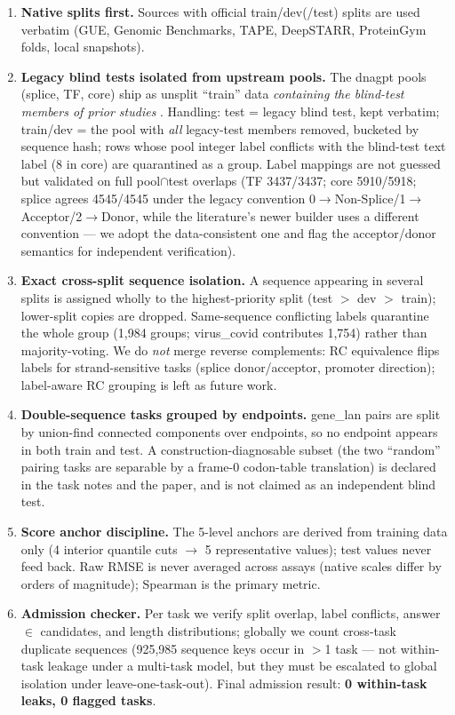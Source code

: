 \begin{enumerate}
\item \textbf{Native splits first.} Sources with official train/dev(/test) splits are used
verbatim (GUE, Genomic Benchmarks, TAPE, DeepSTARR, ProteinGym folds, local snapshots).
\item \textbf{Legacy blind tests isolated from upstream pools.} The dnagpt pools (splice,
TF, core) ship as unsplit ``train'' data \emph{containing the blind-test members of prior
studies} \citep{wang2026biopaws}. Handling: test = legacy blind test, kept verbatim;
train/dev = the pool with \emph{all} legacy-test members removed, bucketed by sequence
hash; rows whose pool integer label conflicts with the blind-test text label (8 in core)
are quarantined as a group. Label mappings are not guessed but validated on full
pool$\cap$test overlaps (TF 3437/3437; core 5910/5918; splice agrees 4545/4545 under the
legacy convention 0$\to$Non-Splice/1$\to$Acceptor/2$\to$Donor, while the literature's newer
builder uses a different convention --- we adopt the data-consistent one and flag the
acceptor/donor semantics for independent verification).
\item \textbf{Exact cross-split sequence isolation.} A sequence appearing in several splits
is assigned wholly to the highest-priority split (test $>$ dev $>$ train); lower-split
copies are dropped. Same-sequence conflicting labels quarantine the whole group (1{,}984
groups; virus\_covid contributes 1{,}754) rather than majority-voting. We do
\emph{not} merge reverse complements: RC equivalence flips labels for strand-sensitive
tasks (splice donor/acceptor, promoter direction); label-aware RC grouping is left as
future work.
\item \textbf{Double-sequence tasks grouped by endpoints.} gene\_lan pairs are split by
union-find connected components over endpoints, so no endpoint appears in both train and
test. A construction-diagnosable subset (the two ``random'' pairing tasks are separable by
a frame-0 codon-table translation) is declared in the task notes and the paper, and is not
claimed as an independent blind test.
\item \textbf{Score anchor discipline.} The 5-level anchors are derived from training data
only (4 interior quantile cuts $\to$ 5 representative values); test values never feed back.
Raw RMSE is never averaged across assays (native scales differ by orders of magnitude);
Spearman is the primary metric.
\item \textbf{Admission checker.} Per task we verify split overlap, label conflicts,
answer $\in$ candidates, and length distributions; globally we count cross-task duplicate
sequences (925{,}985 sequence keys occur in $>$1 task --- not within-task leakage under a
multi-task model, but they must be escalated to global isolation under leave-one-task-out).
Final admission result: \textbf{0 within-task leaks, 0 flagged tasks}.
\end{enumerate}

